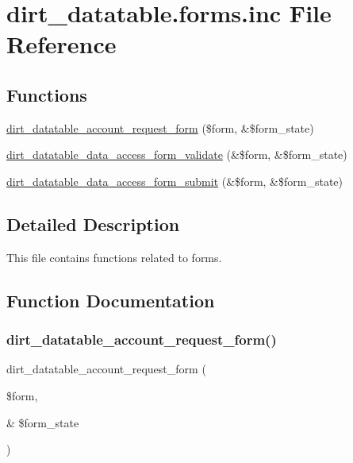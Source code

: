 \hypertarget{dirt__datatable_8forms_8inc}{}\section{dirt\+\_\+datatable.\+forms.\+inc File Reference}
\label{dirt__datatable_8forms_8inc}
\subsection*{Functions}
\begin{DoxyCompactItemize}
\item 
\mbox{\hyperlink{dirt__datatable_8forms_8inc_a1f08ef34a38056f3c2061c917ddf063e}{dirt\+\_\+datatable\+\_\+account\+\_\+request\+\_\+form}} (\$form, \&\$form\+\_\+state)
\item 
\mbox{\hyperlink{dirt__datatable_8forms_8inc_a956aae061ced3ad7f73b33de959cfebc}{dirt\+\_\+datatable\+\_\+data\+\_\+access\+\_\+form\+\_\+validate}} (\&\$form, \&\$form\+\_\+state)
\item 
\mbox{\hyperlink{dirt__datatable_8forms_8inc_a2fe95fc37151c71c1a21e9b2480db898}{dirt\+\_\+datatable\+\_\+data\+\_\+access\+\_\+form\+\_\+submit}} (\&\$form, \&\$form\+\_\+state)
\end{DoxyCompactItemize}


\subsection{Detailed Description}
This file contains functions related to forms. 

\subsection{Function Documentation}
\mbox{\label{dirt__datatable_8forms_8inc_a1f08ef34a38056f3c2061c917ddf063e}} 
\subsubsection{\texorpdfstring{dirt\+\_\+datatable\+\_\+account\+\_\+request\+\_\+form()}{dirt\_datatable\_account\_request\_form()}}
{\footnotesize\ttfamily dirt\+\_\+datatable\+\_\+account\+\_\+request\+\_\+form (\begin{DoxyParamCaption}\item[{}]{\$form,  }\item[{\&}]{\$form\+\_\+state }\end{DoxyParamCaption})}

